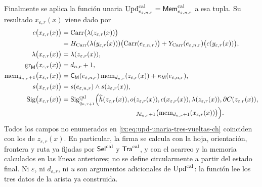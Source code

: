 Finalmente se aplica la función unaria
\(\operatorname{Upd}^{\rm cal}_{e_{\varepsilon,n,r}}
=\mathsf{Mem}^{\rm cal}_{e_{\varepsilon,n,r}}\) a esa tupla. Su
resultado \(x_{\varepsilon,r}(x)\) viene dado por
\begin{equation}
\begin{aligned}
 c\bigl(x_{\varepsilon,r}(x)\bigr)
   &=\operatorname{Carr}\bigl(\lambda(z_{\varepsilon,r}(x))\bigr)\\
   &=H_{\rm Carr}(\lambda(y_{\varepsilon,r}(x)))
       \bigl(\operatorname{Carr}(e_{\varepsilon,n,r})\bigr)
     +Y_{\rm Carr}(e_{\varepsilon,n,r})
       \bigl(c(y_{\varepsilon,r}(x))\bigr),\\
 \lambda\bigl(x_{\varepsilon,r}(x)\bigr)
   &=\lambda(z_{\varepsilon,r}(x)),\\
 \operatorname{gr}_{\mathsf M}
      \bigl(x_{\varepsilon,r}(x)\bigr)
   &=d_{n,r}+1,\\
 \operatorname{mem}_{d_{n,r}+1}
       \bigl(x_{\varepsilon,r}(x)\bigr)
   &=\mathsf C_{\mathsf M}(e_{\varepsilon,n,r})
       \operatorname{mem}_{d_{n,r}}(z_{\varepsilon,r}(x))
     +\kappa_{\mathsf M}(e_{\varepsilon,n,r}),\\
 s\bigl(x_{\varepsilon,r}(x)\bigr)
   &=s(e_{\varepsilon,n,r})\wedge s(z_{\varepsilon,r}(x)),\\
 \operatorname{Sig}\bigl(x_{\varepsilon,r}(x)\bigr)
   &=\operatorname{Sig}^{\rm cal}_{\widetilde q_{n,r+1}}
       \Bigl(\widehat h(z_{\varepsilon,r}(x)),
             o(z_{\varepsilon,r}(x)),
             c(x_{\varepsilon,r}(x)),
             \lambda(z_{\varepsilon,r}(x)),
             \partial C(z_{\varepsilon,r}(x)),\\[-2pt]
   &\hspace{112pt}
             \jmath_{d_{n,r}+1}
              \bigl(\operatorname{mem}_{d_{n,r}+1}
                 (x_{\varepsilon,r}(x))\bigr)\Bigr).
\end{aligned}
\label{ix:eq:upd-unaria-tres-vueltas-ch}
\end{equation}
Todos los campos no enumerados en
\eqref{ix:eq:upd-unaria-tres-vueltas-ch} coinciden con los de
\(z_{\varepsilon,r}(x)\). En particular, la firma se calcula con la hoja,
orientación, frontera y ruta ya fijadas por \(\mathsf{Sel}^{\rm cal}\) y
\(\mathsf{Tra}^{\rm cal}\), y con el acarreo y la memoria calculados en las
líneas anteriores; no se define circularmente a partir del estado final.
Ni \(\varepsilon\), ni \(d_{\varepsilon,r}\), ni \(u\) son argumentos
adicionales de \(\operatorname{Upd}^{\rm cal}\): la función lee los tres datos de la
arista ya construida.

